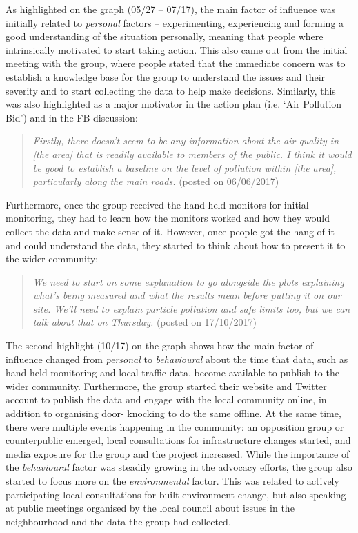 As highlighted on the graph (05/27 -- 07/17), the main factor of influence was initially related to \textit{personal} factors -- experimenting, experiencing and forming a good understanding of the situation personally, meaning that people where intrinsically motivated to start taking action. This also came out from the initial meeting with the group, where people stated that the immediate concern was to establish a knowledge base for the group to understand the issues and their severity and to start collecting the data to help make decisions. Similarly, this was also highlighted as a major motivator in the action plan (i.e. `Air Pollution Bid') and in the FB discussion:
\begin{quote}
    \textit{Firstly, there doesn't seem to be any information about the air quality in [the area] that is readily available to members of the public. I think it would be good to establish a baseline on the level of pollution within [the area], particularly along the main roads.} (posted on 06/06/2017)
\end{quote}
Furthermore, once the group received the hand-held monitors for initial monitoring, they had to learn how the monitors worked and how they would collect the data and make sense of it. However, once people got the hang of it and could understand the data, they started to think about how to present it to the wider community:
\begin{quote}
    \textit{We need to start on some explanation to go alongside the plots explaining what's being measured and what the results mean before putting it on our site. We'll need to explain particle pollution and safe limits too, but we can talk about that on Thursday.} (posted on 17/10/2017)
\end{quote}
The second highlight (10/17) on the graph shows how the main factor of influence changed from \textit{personal} to \textit{behavioural} about the time that data, such as hand-held monitoring and local traffic data, become available to publish to the wider community. Furthermore, the group started their website and Twitter account to publish the data and engage with the local community online, in addition to organising door- knocking to do the same offline. At the same time, there were multiple events happening in the community: an opposition group or counterpublic \citep{warner_publics_2005} emerged, local consultations for infrastructure changes started, and media exposure for the group and the project increased. While the importance of the \textit{behavioural} factor was steadily growing in the advocacy efforts, the group also started to focus more on the \textit{environmental} factor. This was related to actively participating local consultations for built environment change, but also speaking at public meetings organised by the local council about issues in the neighbourhood and the data the group had collected.

